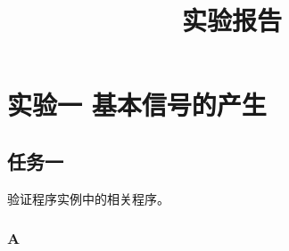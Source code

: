 \documentclass[12pt,a4paper,UTF8]{article}
\title{实验报告}
\begin{document}
    
    
    \tableofcontents
    
    

    
    \section{实验一
基本信号的产生}\label{ux5b9eux9a8cux4e00-ux57faux672cux4fe1ux53f7ux7684ux4ea7ux751f}

\subsection{任务一}\label{ux4efbux52a1ux4e00}

验证程序实例中的相关程序。

\subsubsection{A}\label{a}
\end{document}
